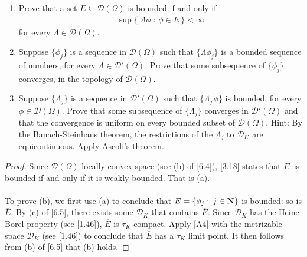 \renewcommand{\labelenumi}{(\alph{enumi})} 
{\it  
\begin{enumerate}
\item Prove that a set $E\subseteq \mathscr{D}(\Omega)$ is bounded if and only if 
\begin{align*}
\sup \{\lvert\Lambda \phi\rvert:\, \phi \in E\,\}< \infty
\end{align*} 
for every $\Lambda \in \mathscr{D}(\Omega)$.
\item Suppose $\{\phi_j\}$ is a sequence in $\mathscr{D}(\Omega)$ such that $\{\Lambda \phi_j\}$ is a bounded sequence of numbers, for every $\Lambda \in \mathscr{D}'(\Omega)$. Prove that some subsequence of $\{\phi_j\}$ converges, in the topology of $\mathscr{D}(\Omega)$.
\item Suppose $\{\Lambda _j\}$ is a sequence in $\mathscr{D}'(\Omega)$ such that $\{\Lambda_{j\,} \phi\}$ is bounded, for every $\phi \in \mathscr{D}(\Omega)$. Prove that some subsequence of $\{\Lambda _j\}$ converges in $\mathscr{D}'(\Omega)$ and that the convergence is uniform on every bounded subset of $\mathscr{D}(\Omega)$. Hint: By the Banach-Steinhaus theorem, the restrictions of the $\Lambda_j$ to $\mathscr{D}_K$ are equicontinuous. Apply Ascoli's theorem.
\end{enumerate}}
\begin{proof} 
Since $\mathscr{D}(\Omega)$ locally convex space (see (b) of [6.4]), [3.18] states that $E\,$ is bounded if and only if it is weakly bounded. That is (a). \\
\\
To prove (b), we first use (a) to conclude that $E= \{\phi_j:\, j\in {\mathbf N}\}$ is bounded: so is $\overline{E}$. %
By (c) of [6.5], there exists some $ \mathscr{D}_K$ that contains $\overline{E}$. %
Since $ \mathscr{D}_K$ has the Heine-Borel property (see [1.46]), $\overline{E}$ is $\tau_K$-compact. %
Apply [A4] with the metrizable space $\mathscr{D}_K$ (see [1.46]) to conclude that $\overline{E}$ has a $\tau_K$ limit point. %
It then follows from (b) of [6.5] that (b) holds.
\end{proof}